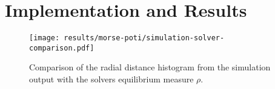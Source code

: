 \chapter{Implementation and Results}
\label{chap:implementation-and-results}



\begin{figure}[H]
  \centering
  \label{fig:simulation-solver-comparison}
  \texttt{[image: results/morse-poti/simulation-solver-comparison.pdf]}
  \caption{Comparison of the radial distance histogram from the simulation output with the solvers equilibrium measure $\rho$.}
\end{figure}
